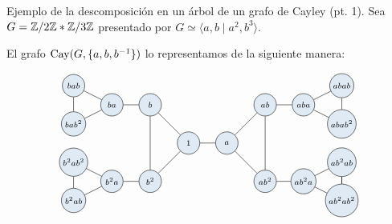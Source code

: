 \documentclass[aspectratio=169, 11pt]{beamer}
\begin{document}
	\begin{frame}[fragile]{Ejemplo de la descomposición en un árbol de un grafo de Cayley (pt. 1).}
	Sea $G = \mathbb{Z} / 2\mathbb{Z} \ast \mathbb{Z} / 3\mathbb{Z} $ presentado por 
	$G \simeq \langle a,b \mid a^2, b^3 \rangle$.

	El grafo $\text{Cay}(G, \{ a,b,b^{-1} \})$ lo representamos de la siguiente manera:
	
		\[
			\begin{tikzpicture}
			[scale=0.60,V/.style = {circle, draw,align= center, minimum size=0.5cm,
				minimum size=2em,inner sep=2,
				 fill=astral!15,font=\scriptsize	},fill fraction/.style={path picture={
						\fill[#1] 
						(path picture bounding box.south) rectangle
						(path picture bounding box.north west);
				}},
				fill fraction/.default=astral!90
				]
		\node[align=center] at (2, -6) {};
			\begin{scope}[nodes=V,xshift=4.5cm, yshift=-4cm]
					\node (1) at (0,0) {$1$};
					\node (a) at (2,0)  {$a$};
					\node (b) at (-2,2)     {$b$};
					\node (bb) at (-2,-2)    {$b^2$};
					\node (ab) at (4,2)      {$ab$};
					\node (abb) at (4,-2)     {$ab^2$};
					\node (ba) at (-4,2)     {$ba$};
					\node (bba) at (-4,-2)     {$b^2a$};
					\node (aba) at (6,2)    {$aba$};
					\node (abba) at (6,-2)    {$ab^2a$};
					\node (bab) at (-6,3)    {$bab$};
					\node (babb) at (-6,1)     {$bab^2$};
					\node (bbab) at (-6,-3)     {$b^2ab$};
					\node (bbabb) at (-6,-1)    {$b^2ab^2$};
					\node (abab) at (8,3)    {$abab$};
					\node (ababb) at (8,1)    {$abab^2$};
					\node (abbab) at (8,-1)     {$ab^2ab$};
					\node (abbabb) at (8,-3)  {$ab^2ab^2$};
			\end{scope}
			
			\draw   (1)  edge[-] (a);
			\draw   (1)  edge[-] (b);
			\draw   (1)  edge[-] (bb);
			\draw   (b)  edge[-] (bb);
			\draw   (b)  edge[-] (ba);
			\draw   (bb)  edge[-] (bba);
			\draw   (a)  edge[-] (ab);
			\draw   (abb)  edge[-] (a);
			\draw   (ab)  edge[-] (abb);
			\draw   (ab)  edge[-] (aba);
			\draw   (aba)  edge[-] (abab);
			\draw   (ababb)  edge[-] (aba);
			\draw   (ababb)  edge[-] (abab);
			\draw   (abb)  edge[-] (abba);
			\draw   (abba)  edge[-] (abbab);
			\draw   (abba)  edge[-] (abbabb);
			\draw   (bba)  edge[-] (bbabb);
			\draw   (bba)  edge[-] (bbab);
			\draw   (ba)  edge[-] (bab);
			\draw   (babb)  edge[-] (bab);
			\draw   (abbab)  edge[-] (abbabb);
			\draw   (ba)  edge[-] (babb);
			\draw   (bbabb)  edge[-] (bbab);
			\draw   (abbab)  edge[-] (abbabb);
	\end{tikzpicture}
	\]
	\end{frame}
	
\end{document}
